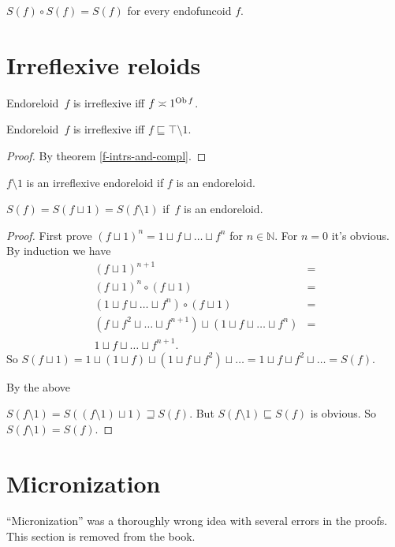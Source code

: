 \begin{conjecture}
$S(f)\circ S(f)=S(f)$ for every endofuncoid $f$.\end{conjecture}

\section{Irreflexive reloids}

\begin{defn}
Endoreloid~$f$ is irreflexive iff $f\asymp 1^{\operatorname{Ob} f}$.
\end{defn}

\begin{prop}
Endoreloid~$f$ is irreflexive iff $f\sqsubseteq \top\setminus 1$.
\end{prop}

\begin{proof}
By theorem \ref{f-intrs-and-compl}.
\end{proof}

\begin{obvious}
$f \setminus 1$ is an irreflexive endoreloid if $f$ is an endoreloid.
\end{obvious}

\begin{prop}
$S (f) = S (f \sqcup 1) = S (f \setminus 1)$ if~$f$ is an endoreloid.
\end{prop}

\begin{proof}
First prove $(f \sqcup 1)^n = 1 \sqcup f \sqcup \ldots \sqcup f^n$ for $n \in
\mathbb{N}$. For $n = 0$ it's obvious. By induction we have
\begin{align*}
(f\sqcup 1)^{n+1} &= \\
(f\sqcup 1)^n\circ(f\sqcup 1) &= \\
(1\sqcup f\sqcup\dots\sqcup f^n)\circ(f\sqcup 1) &= \\
(f\sqcup f^2\sqcup\dots\sqcup f^{n+1}) \sqcup (1\sqcup f\sqcup\dots\sqcup f^n) &= \\
1\sqcup f\sqcup\dots\sqcup f^{n+1}.
\end{align*}
So $S (f \sqcup 1) = 1 \sqcup (1 \sqcup f) \sqcup (1 \sqcup f \sqcup f^2) \sqcup
\ldots = 1 \sqcup f \sqcup f^2 \sqcup \ldots = S (f)$.

By the above

$S (f \setminus 1) = S ((f \setminus 1) \sqcup 1) \sqsupseteq S (f)$. But $S
(f \setminus 1) \sqsubseteq S (f)$ is obvious. So $S (f \setminus 1) = S (f)$.
\end{proof}

\section{Micronization}

``Micronization'' was a thoroughly wrong idea with several errors in
the proofs. This section is removed from the book.
